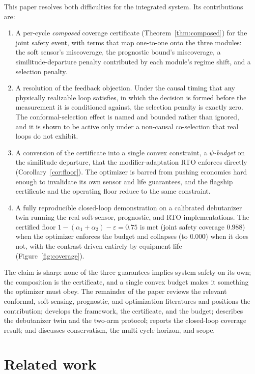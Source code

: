 \documentclass[review,12pt]{elsarticle}
\theoremstyle{definition}
\begin{document}
This paper resolves both difficulties for the integrated system. Its contributions are:
\begin{enumerate}
\item A per-cycle \emph{composed} coverage certificate (Theorem~\ref{thm:composed}) for
the joint safety event, with terms that map one-to-one onto the three modules: the soft
sensor's miscoverage, the prognostic bound's miscoverage, a similitude-departure penalty
contributed by each module's regime shift, and a selection penalty.
\item A resolution of the feedback objection. Under the causal timing that any physically
realizable loop satisfies, in which the decision is formed before the measurement it is
conditioned against, the selection penalty is exactly zero. The conformal-selection effect
is named and bounded rather than ignored, and it is shown to be active only under a
non-causal co-selection that real loops do not exhibit.
\item A conversion of the certificate into a single convex constraint, a \emph{$\psi$-budget}
on the similitude departure, that the modifier-adaptation RTO enforces directly
(Corollary~\ref{cor:floor}). The optimizer is barred from pushing economics hard enough to
invalidate its own sensor and life guarantees, and the flagship certificate and the
operating floor reduce to the same constraint.
\item A fully reproducible closed-loop demonstration on a calibrated debutanizer twin
running the real soft-sensor, prognostic, and RTO implementations. The certified floor
$1-(\alpha_1+\alpha_2)-\varepsilon = 0.75$ is met (joint safety coverage $0.988$) when the
optimizer enforces the budget and collapses (to $0.000$) when it does not, with the
contrast driven entirely by equipment life (Figure~\ref{fig:coverage}).
\end{enumerate}

The claim is sharp: none of the three guarantees implies system safety on its own; the
composition is the certificate, and a single convex budget makes it something the optimizer
must obey. The remainder of the paper reviews the relevant
conformal, soft-sensing, prognostic, and optimization literatures and positions the
contribution; develops the framework, the certificate, and the budget; describes the
debutanizer twin and the two-arm protocol; reports the closed-loop coverage result; and
discusses conservatism, the multi-cycle horizon, and scope.

\section{Related work}
\label{sec:related}
\end{document}
